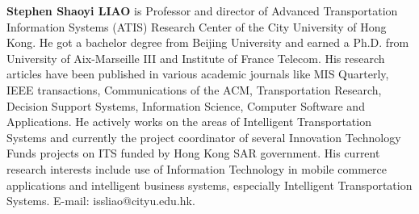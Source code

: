 \documentclass[12pt,onecolumn,twoside]{JCTA}
\theoremstyle{mystyle}
\begin{document}
\vspace{.5\baselineskip} {\selectfont\scriptsize
{\bf Stephen Shaoyi LIAO} is Professor and director of Advanced Transportation Information Systems (ATIS) Research Center of the City University of Hong Kong. He got a bachelor degree from Beijing University and earned a Ph.D. from University of Aix-Marseille III and Institute of France Telecom.  His research articles have been published in various academic journals like MIS Quarterly, IEEE transactions, Communications of the ACM, Transportation Research, Decision Support Systems, Information Science, Computer Software and Applications. He actively works on the areas of Intelligent Transportation Systems and currently the project coordinator of several Innovation Technology Funds projects on ITS funded by Hong Kong SAR government.  His current research interests include use of Information Technology in mobile commerce applications and intelligent business systems, especially Intelligent Transportation Systems. E-mail: issliao@cityu.edu.hk.
\par}
\end{document}
